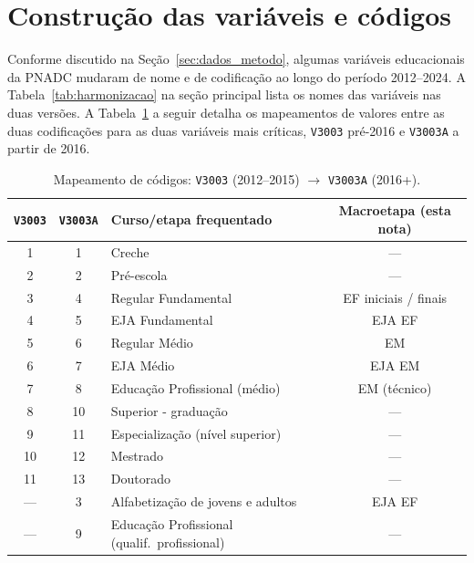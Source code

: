 
\section{Construção das variáveis e códigos}
\label{app:variaveis}

Conforme discutido na Seção~\ref{sec:dados_metodo}, algumas variáveis
educacionais da PNADC mudaram de nome e de codificação ao longo do
período 2012--2024. A Tabela~\ref{tab:harmonizacao} na seção principal
lista os nomes das variáveis nas duas versões. A
Tabela~\ref{tab:codigos_v3003} a seguir detalha os mapeamentos de
valores entre as duas codificações para as duas variáveis mais
críticas, \texttt{V3003} pré-2016 e \texttt{V3003A} a partir de 2016.

\begin{table}[htbp]
\centering
\caption{Mapeamento de códigos: \texttt{V3003} (2012--2015) $\to$ \texttt{V3003A} (2016+).}
\label{tab:codigos_v3003}
\small
\begin{tabular}{cclc}
\toprule
\texttt{V3003} & \texttt{V3003A} & Curso/etapa frequentado & Macroetapa (esta nota) \\
\midrule
1 & 1 & Creche                                          & ---             \\
2 & 2 & Pré-escola                                      & ---             \\
3 & 4 & Regular Fundamental                             & EF iniciais / finais \\
4 & 5 & EJA Fundamental                                 & EJA EF          \\
5 & 6 & Regular Médio                                   & EM              \\
6 & 7 & EJA Médio                                       & EJA EM          \\
7 & 8 & Educação Profissional (médio)                   & EM (técnico)    \\
8 & 10 & Superior - graduação                           & ---             \\
9 & 11 & Especialização (nível superior)                & ---             \\
10 & 12 & Mestrado                                      & ---             \\
11 & 13 & Doutorado                                     & ---             \\
--- & 3  & Alfabetização de jovens e adultos            & EJA EF          \\
--- & 9  & Educação Profissional (qualif.\ profissional) & ---             \\
\bottomrule
\end{tabular}
\end{table}

